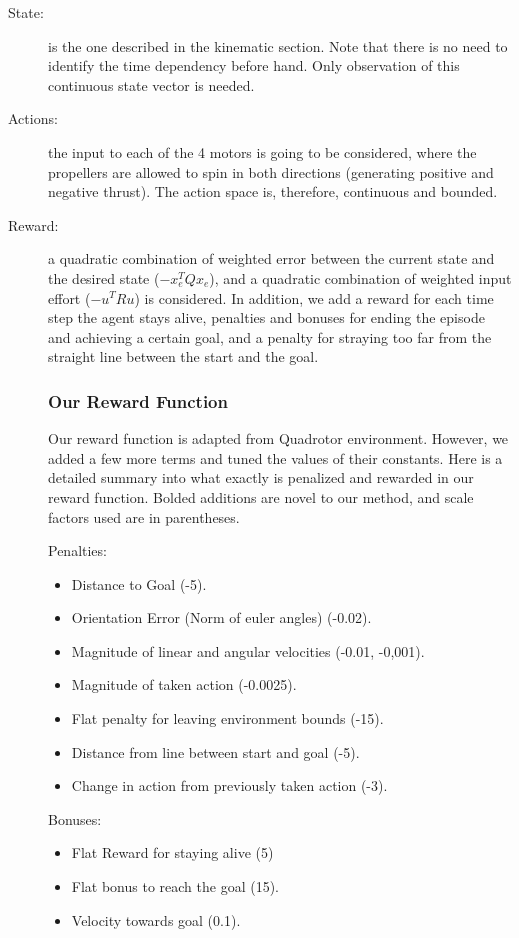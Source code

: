 \begin{description}
    \item [State:] is the one described in the kinematic section. Note that there is 
    no need to identify the time dependency before hand. Only observation of this 
    continuous state vector is needed.
    \item [Actions:] the input to each of the 4 motors is going to be considered, where 
    the propellers are allowed to spin in both directions (generating positive and negative
    thrust). The action space is, therefore, continuous and bounded.
    \item [Reward:] a quadratic combination of weighted error between the current state and 
    the desired state ($-x_e^T Q x_e$), and a quadratic combination of weighted input effort ($-u^T R u$) is considered. 
    In addition, we add a reward for each time step the agent stays alive, penalties and bonuses for ending the episode and achieving a certain goal, and a penalty for straying too far from the straight line between the start and the goal.
    
\subsubsection{Our Reward Function}

Our reward function is adapted from \cite{adipandas} Quadrotor environment. However, we added a few more terms and tuned the values of their constants. Here is a detailed summary into what exactly is penalized and rewarded in our reward function. Bolded additions are novel to our method, and scale factors used are in parentheses.

\noindent Penalties:
\begin{itemize}
    \item Distance to Goal (-5).
    \item Orientation Error (Norm of euler angles) (-0.02).
    \item Magnitude of linear and angular velocities (-0.01, -0,001).
    \item Magnitude of taken action (-0.0025).
    \item Flat penalty for leaving environment bounds (-15).
    \item Distance from line between start and goal (-5).
    \item Change in action from previously taken action (-3).
\end{itemize}

\noindent Bonuses:
\begin{itemize}
    \item Flat Reward for staying alive (5)
    \item Flat bonus to reach the goal (15).
    \item Velocity towards goal (0.1).
\end{itemize}

\end{description}
 

